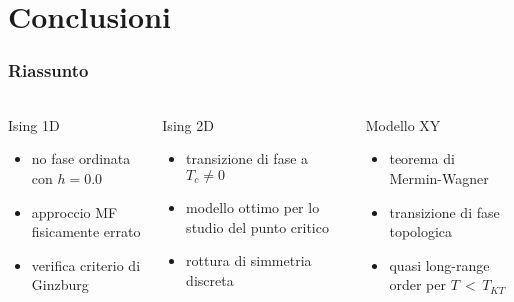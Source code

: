 \section{Conclusioni}

\begin{frame}
    \frametitle{Riassunto}
    \framesubtitle{}

    \begin{columns}
        \begin{column}{0.33\textwidth}
            \begin{block}{Ising 1D}

                \begin{itemize}[itemsep=0.5em, label=$\diamond$]
                    \item no fase ordinata con $h = 0.0$
                    \item approccio MF fisicamente errato
                    \item verifica criterio di Ginzburg
                \end{itemize}
            
            \end{block}
        \end{column}
    
        \begin{column}{0.33\textwidth}
            \begin{block}{Ising 2D}

                \begin{itemize}[itemsep=0.5em, label=$\diamond$]
                    \item transizione di fase a $T_c \neq 0$
                    \item modello ottimo per lo studio del punto critico
                    \item rottura di simmetria discreta
                \end{itemize}
            
            \end{block}
        \end{column}

        \begin{column}{0.33\textwidth}
            \begin{block}{Modello XY}

                \begin{itemize}[itemsep=0.5em, label=$\diamond$]
                    \item teorema di Mermin-Wagner
                    \item transizione di fase topologica
                    \item quasi long-range order per $T\,<\,T_{KT}$
                \end{itemize}


\end{block}
\end{column}
\end{columns}
\end{frame}
